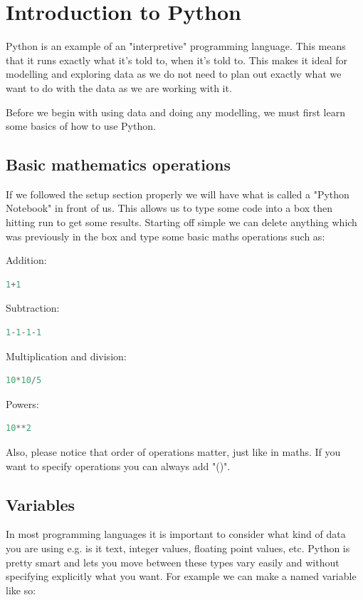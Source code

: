 \documentclass[12pt]{article}
\begin{document}
\section{Introduction to Python}

Python is an example of an "interpretive" programming language. This means that it runs exactly what it's told to, when it's told to. This makes it ideal for modelling and exploring data as we do not need to plan out exactly what we want to do with the data as we are working with it. 

Before we begin with using data and doing any modelling, we must first learn some basics of how to use Python.

\subsection{Basic mathematics operations}

If we followed the setup section properly we will have what is called a "Python Notebook" in front of us. This allows us to type some code into a box then hitting run to get some results. Starting off simple we can delete anything which was previously in the box and type some basic maths operations such as: 

Addition:
\begin{lstlisting}[language=Python]
    1+1
\end{lstlisting}

Subtraction:
\begin{lstlisting}[language=Python]
    1-1-1-1
\end{lstlisting}

Multiplication and division:
\begin{lstlisting}[language=Python]
    10*10/5
\end{lstlisting}

Powers:
\begin{lstlisting}[language=Python]
    10**2
\end{lstlisting}

Also, please notice that order of operations matter, just like in maths. If you want to specify operations you can always add "()". 

\subsection{Variables}

In most programming languages it is important to consider what kind of data you are using e.g. is it text, integer values, floating point values, etc. Python is pretty smart and lets you move between these types vary easily and without specifying explicitly what you want. For example we can make a named variable like so: 
\end{document}
